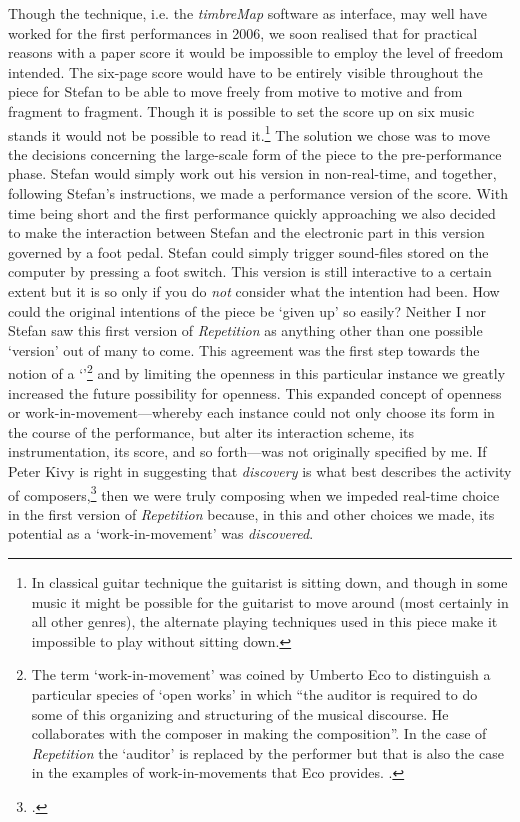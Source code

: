 \label{sec:3-par:3}
Though the technique, i.e. the \emph{timbreMap} software as interface, may well have worked for the first performances in 2006, we soon realised that for practical reasons with a paper score it would be impossible to employ the level of freedom intended. The six-page score would have to be entirely visible throughout the piece for Stefan to be able to move freely from motive to motive and from fragment to fragment. Though it is possible to set the score up on six music stands it would not be possible to read it.\footnote{In classical guitar technique the guitarist is sitting down, and though in some music it might be possible for the guitarist to move around (most certainly in all other genres), the alternate playing techniques used in this piece make it impossible to play without sitting down.} The solution we chose was to move the decisions concerning the large-scale form of the piece to the pre-performance phase. Stefan would simply work out his version in non-real-time, and together, following Stefan's instructions, we made a performance version of the score. With time being short and the first performance quickly approaching we also decided to make the interaction between Stefan and the electronic part in this version governed by a foot pedal. Stefan could simply trigger sound-files stored on the computer by pressing a foot switch. This version is still interactive to a certain extent but it is so only if you do \emph{not} consider what the intention had been. How could the original intentions of the piece be `given up' so easily? Neither I nor Stefan saw this first version of \emph{Repetition} as anything other than one possible `version' out of many to come. This agreement was the first step towards the notion of a `'\footnote{The term `work-in-movement' was coined by Umberto Eco to distinguish a particular species of `open works' in which ``the auditor is required to do some of this organizing and structuring of the musical discourse. He collaborates with the composer in making the composition''. In the case of \emph{Repetition} the `auditor' is replaced by the performer but that is also the case in the examples of work-in-movements that Eco provides. \cite{eco68}.} and by limiting the openness in this particular instance we greatly increased the future possibility for openness. This expanded concept of openness or work-in-movement---whereby each instance could not only choose its form in the course of the performance, but alter its interaction scheme, its instrumentation, its score, and so forth---was not originally specified by me. If Peter Kivy is right in suggesting that \emph{discovery} is what best describes the activity of composers,\footcite[214]{kivy02} then we were truly composing when we impeded real-time choice in the first version of \emph{Repetition} because, in this and other choices we made, its potential as a `work-in-movement' was \emph{discovered}.


